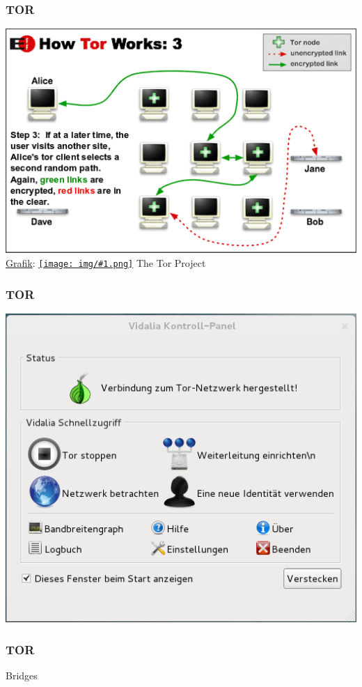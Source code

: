 \documentclass[12pt]{beamer}
\newcommand{\cc}[1]{\texttt{[image: img/\#1.png]}\hspace{1mm}}
\begin{document}
\begin{frame}
    \frametitle{TOR}
    \includegraphics[height=0.7\textheight]{img/tor3.png}
    \\{\small \href{https://www.torproject.org/images/htw3.png}{Grafik}: \href{https://creativecommons.org/licenses/by/3.0/us/}{\cc{by}} The Tor Project}
\end{frame}

\begin{frame}
    \frametitle{TOR}
    \includegraphics[height=0.7\textheight]{img/vidalia.png}
\end{frame}

\begin{frame}
    \frametitle{TOR}
    \begin{center} \Large Bridges \end{center}
\end{frame}
\end{document}
